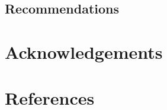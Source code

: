 \documentclass[a4paper,12pt,twoside]{article}
\begin{document}
    \begin{multicols}{2}
    \lipsum[0-5]
    \end{multicols}
    
\subsection{Recommendations}

    \begin{multicols}{2}
    \lipsum[0-5]
    \end{multicols}

\section{Acknowledgements}

    \begin{multicols}{2}
    \lipsum[0-5]
    \end{multicols}

\section{References}

    \begin{multicols}{2}
    \lipsum[0-5]
    \end{multicols}
\end{document}
